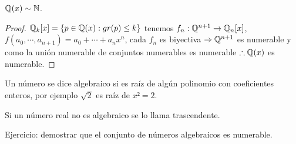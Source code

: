 \begin{eg}
    $\mathbb{Q}(x) \sim \mathbb{N}$.
    \begin{proof}
        $\mathbb{Q}_k[x] = \{ p \in \mathbb{Q}(x) : gr(p) \leq k \}$ tenemos $f_n : \mathbb{Q}^{n+1} \to \mathbb{Q}_n[x]$, $f(a_0, \cdots, a_{n+1}) = a_0 + \cdots + a_nx^n$, cada $f_n$ es biyectiva $\Rightarrow \mathbb{Q}^{n+1}$ es numerable y como la unión numerable de conjuntos numerables es numerable $\therefore \mathbb{Q}(x)$ es numerable. 
    \end{proof}
\end{eg}

\begin{definition}
    Un número se dice algebraico si es raíz de algún polinomio con coeficientes enteros, por ejemplo $\sqrt{2}$ es raíz de $x² = 2$. 
\end{definition}

\begin{definition}
    Si un número real no es algebraico se lo llama trascendente.
\end{definition}

Ejercicio: demostrar que el conjunto de números algebraicos es numerable.

